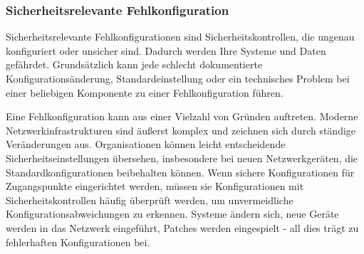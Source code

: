\subsubsection{Sicherheitsrelevante Fehlkonfiguration}

Sicherheitsrelevante Fehlkonfigurationen sind 
Sicherheitskontrollen, die ungenau konfiguriert oder
unsicher sind. Dadurch werden Ihre Systeme und Daten 
gef\"ahrdet. Grunds\"atzlich kann jede schlecht dokumentierte 
Konfigurations\"anderung, Standardeinstellung oder ein 
technisches Problem bei einer beliebigen Komponente zu 
einer Fehlkonfiguration f\"uhren.

Eine Fehlkonfiguration kann aus einer Vielzahl von 
Gr\"unden auftreten. Moderne Netzwerkinfrastrukturen sind
\"au{\ss}erst komplex und zeichnen sich durch st\"andige
Ver\"anderungen aus. Organisationen k\"onnen leicht 
entscheidende Sicherheitseinstellungen \"ubersehen, 
insbesondere bei neuen Netzwerkger\"aten, die 
Standardkonfigurationen beibehalten k\"onnen. Wenn
sichere Konfigurationen f\"ur Zugangspunkte eingerichtet 
werden, m\"ussen sie Konfigurationen mit Sicherheitskontrollen
h\"aufig \"uberpr\"uft werden, um unvermeidliche 
Konfigurationsabweichungen zu erkennen. Systeme
\"andern sich, neue Ger\"ate werden in das Netzwerk
eingef\"uhrt, Patches werden eingespielt - all dies
tr\"agt zu fehlerhaften Konfigurationen bei.

